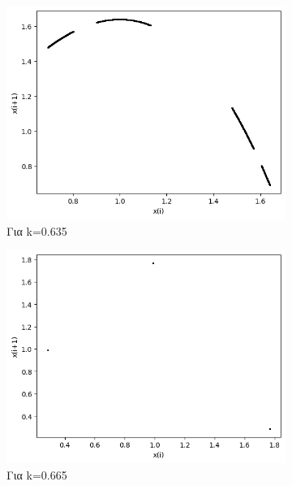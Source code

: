 \begin{figure}[h!]
\begin{subfigure}[b]{0.25\textwidth}
		\includegraphics[width=\textwidth]{LateX images/graphs q09/g8}
		\caption{Για k=0.635}
		\label{f:k54}
	\end{subfigure}
	\hfill
	\begin{subfigure}[b]{0.25\textwidth}
		\centering
		\includegraphics[width=\textwidth]{LateX images/graphs q09/g9}
		\caption{Για k=0.665}
		\label{f:k55}
	\end{subfigure}
	\hfill
	\begin{subfigure}[b]{0.25\textwidth}
		\centering

\end{subfigure}
\end{figure}
